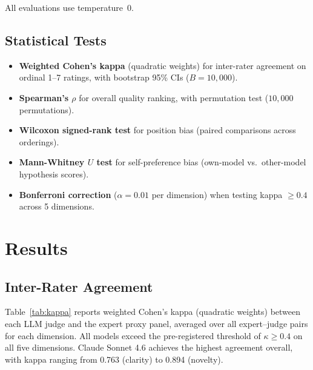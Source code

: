 \documentclass[11pt,a4paper]{article}
\begin{document}
All evaluations use temperature~0.

\subsection{Statistical Tests}
\label{sec:statistics}

\begin{itemize}
  \item \textbf{Weighted Cohen's kappa} (quadratic weights) for
        inter-rater agreement on ordinal 1--7 ratings, with bootstrap 95\%
        CIs ($B = 10{,}000$).
  \item \textbf{Spearman's $\rho$} for overall quality ranking, with
        permutation test ($10{,}000$ permutations).
  \item \textbf{Wilcoxon signed-rank test} for position bias (paired
        comparisons across orderings).
  \item \textbf{Mann-Whitney $U$ test} for self-preference bias
        (own-model vs.\ other-model hypothesis scores).
  \item \textbf{Bonferroni correction} ($\alpha = 0.01$ per dimension)
        when testing kappa $\geq 0.4$ across 5 dimensions.
\end{itemize}

\section{Results}
\label{sec:results}

\subsection{Inter-Rater Agreement}

Table~\ref{tab:kappa} reports weighted Cohen's kappa (quadratic weights)
between each LLM judge and the expert proxy panel, averaged over all
expert--judge pairs for each dimension.  All models exceed the
pre-registered threshold of $\kappa \geq 0.4$ on all five dimensions.
Claude Sonnet 4.6 achieves the highest agreement overall, with kappa
ranging from 0.763 (clarity) to 0.894 (novelty).
\end{document}
